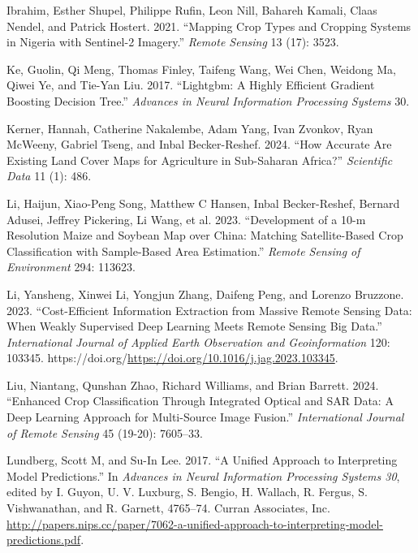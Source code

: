 \documentclass[
  journal,
  twocolumn]{IEEEtran}
\newlength{\cslhangindent}
\newlength{\cslentryspacingunit} %
\newenvironment{CSLReferences}[2] %
 {%
  \setlength{\parindent}{0pt}
  \ifodd #1
  \let\oldpar\par
  \def\par{\hangindent=\cslhangindent\oldpar}
  \fi
  \setlength{\parskip}{#2\cslentryspacingunit}
 }%
 {}
\begin{document}
\begin{CSLReferences}{1}{0}
\leavevmode{}%
Ibrahim, Esther Shupel, Philippe Rufin, Leon Nill, Bahareh Kamali, Claas
Nendel, and Patrick Hostert. 2021. {``Mapping Crop Types and Cropping
Systems in Nigeria with Sentinel-2 Imagery.''} \emph{Remote Sensing} 13
(17): 3523.

\leavevmode{}%
Ke, Guolin, Qi Meng, Thomas Finley, Taifeng Wang, Wei Chen, Weidong Ma,
Qiwei Ye, and Tie-Yan Liu. 2017. {``Lightgbm: A Highly Efficient
Gradient Boosting Decision Tree.''} \emph{Advances in Neural Information
Processing Systems} 30.

\leavevmode{}%
Kerner, Hannah, Catherine Nakalembe, Adam Yang, Ivan Zvonkov, Ryan
McWeeny, Gabriel Tseng, and Inbal Becker-Reshef. 2024. {``How Accurate
Are Existing Land Cover Maps for Agriculture in Sub-Saharan Africa?''}
\emph{Scientific Data} 11 (1): 486.

\leavevmode{}%
Li, Haijun, Xiao-Peng Song, Matthew C Hansen, Inbal Becker-Reshef,
Bernard Adusei, Jeffrey Pickering, Li Wang, et al. 2023. {``Development
of a 10-m Resolution Maize and Soybean Map over China: Matching
Satellite-Based Crop Classification with Sample-Based Area
Estimation.''} \emph{Remote Sensing of Environment} 294: 113623.

\leavevmode{}%
Li, Yansheng, Xinwei Li, Yongjun Zhang, Daifeng Peng, and Lorenzo
Bruzzone. 2023. {``Cost-Efficient Information Extraction from Massive
Remote Sensing Data: When Weakly Supervised Deep Learning Meets Remote
Sensing Big Data.''} \emph{International Journal of Applied Earth
Observation and Geoinformation} 120: 103345.
https://doi.org/\url{https://doi.org/10.1016/j.jag.2023.103345}.

\leavevmode{}%
Liu, Niantang, Qunshan Zhao, Richard Williams, and Brian Barrett. 2024.
{``Enhanced Crop Classification Through Integrated Optical and SAR Data:
A Deep Learning Approach for Multi-Source Image Fusion.''}
\emph{International Journal of Remote Sensing} 45 (19-20): 7605--33.

\leavevmode{}%
Lundberg, Scott M, and Su-In Lee. 2017. {``A Unified Approach to
Interpreting Model Predictions.''} In \emph{Advances in Neural
Information Processing Systems 30}, edited by I. Guyon, U. V. Luxburg,
S. Bengio, H. Wallach, R. Fergus, S. Vishwanathan, and R. Garnett,
4765--74. Curran Associates, Inc.
\url{http://papers.nips.cc/paper/7062-a-unified-approach-to-interpreting-model-predictions.pdf}.


\end{CSLReferences}
\end{document}
